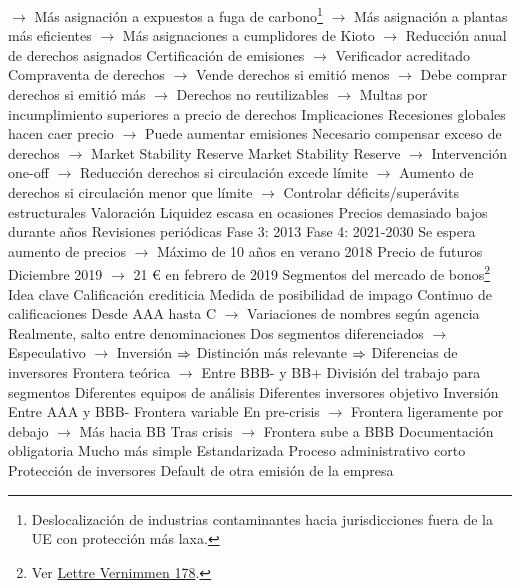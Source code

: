 \documentclass{nuevotema}
\begin{document}
\begin{esquemal}
				\4[] $\to$ Más asignación a expuestos a fuga de carbono\footnote{Deslocalización de industrias contaminantes hacia jurisdicciones fuera de la UE con protección más laxa.}
				\4[] $\to$ Más asignación a plantas más eficientes
				\4[] $\to$ Más asignaciones a cumplidores de Kioto
				\4[] $\to$ Reducción anual de derechos asignados
				\4 Certificación de emisiones
				\4[] $\to$ Verificador acreditado
				\4 Compraventa de derechos
				\4[] $\to$ Vende derechos si emitió menos
				\4[] $\to$ Debe comprar derechos si emitió más
				\4[] $\to$ Derechos no reutilizables
				\4[] $\to$ Multas por incumplimiento superiores a precio de derechos
				\4 Implicaciones
				\4[] Recesiones globales hacen caer precio
				\4[] $\to$ Puede aumentar emisiones
				\4[] Necesario compensar exceso de derechos
				\4[] $\to$ Market Stability Reserve
				\4[] Market Stability Reserve
				\4[] $\to$ Intervención one-off
				\4[] $\to$ Reducción derechos si circulación excede límite
				\4[] $\to$ Aumento de derechos si circulación menor que límite
				\4[] $\to$ Controlar déficits/superávits estructurales
			\3 Valoración
				\4 Liquidez escasa en ocasiones
				\4 Precios demasiado bajos durante años
				\4 Revisiones periódicas
				\4 Fase 3: 2013
				\4 Fase 4: 2021-2030
				\4 Se espera aumento de precios
				\4[] $\to$ Máximo de 10 años en verano 2018
				\4 Precio de futuros Diciembre 2019
				\4[] $\to$ 21 € en febrero de 2019
		\2 Segmentos del mercado de bonos\footnote{Ver \href{https://www.vernimmen.net/Lire/Lettre_Vernimmen/Lettre_178.html}{Lettre Vernimmen 178}.}
			\3 Idea clave
				\4 Calificación crediticia
				\4[] Medida de posibilidad de impago
				\4 Continuo de calificaciones
				\4[] Desde AAA hasta C
				\4[] $\to$ Variaciones de nombres según agencia
				\4 Realmente, salto entre denominaciones
				\4[] Dos segmentos diferenciados
				\4[] $\to$ Especulativo
				\4[] $\to$ Inversión
				\4[] $\Rightarrow$ Distinción más relevante
				\4[] $\Rightarrow$ Diferencias de inversores
				\4[] Frontera teórica
				\4[] $\to$ Entre BBB- y BB+
				\4 División del trabajo para segmentos
				\4[] Diferentes equipos de análisis
				\4[] Diferentes inversores objetivo
			\3 Inversión
				\4 Entre AAA y BBB-
				\4[] Frontera variable
				\4[] En pre-crisis
				\4[] $\to$ Frontera ligeramente por debajo
				\4[] $\to$ Más hacia BB
				\4[] Tras crisis
				\4[] $\to$ Frontera sube a BBB
				\4 Documentación obligatoria
				\4[] Mucho más simple
				\4[] Estandarizada
				\4[] Proceso administrativo corto
				\4 Protección de inversores
				\4[] Default de otra emisión de la empresa

\end{esquemal}
\end{document}
